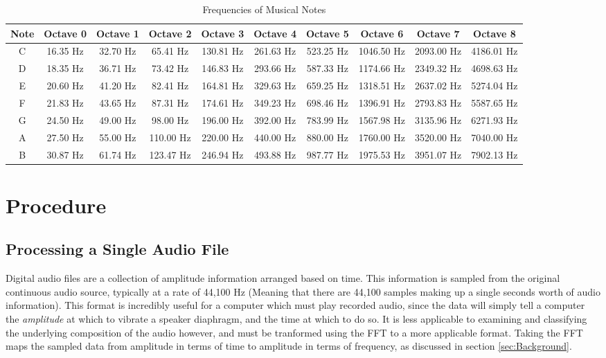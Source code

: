 \documentclass[conference]{IEEEtran}
\begin{document}
\begin{table*}[h]
  \centering
  \begin{tabular}{|c|*{9}{c|}}
    \hline
    Note & Octave 0 & Octave 1 & Octave 2 & Octave 3 & Octave 4 & Octave 5 & Octave 6 & Octave 7 & Octave 8 \\
    \hline
    C & 16.35 Hz & 32.70 Hz & 65.41 Hz & 130.81 Hz & 261.63 Hz & 523.25 Hz & 1046.50 Hz & 2093.00 Hz & 4186.01 Hz \\
    D & 18.35 Hz & 36.71 Hz & 73.42 Hz & 146.83 Hz & 293.66 Hz & 587.33 Hz & 1174.66 Hz & 2349.32 Hz & 4698.63 Hz \\
    E & 20.60 Hz & 41.20 Hz & 82.41 Hz & 164.81 Hz & 329.63 Hz & 659.25 Hz & 1318.51 Hz & 2637.02 Hz & 5274.04 Hz \\
    F & 21.83 Hz & 43.65 Hz & 87.31 Hz & 174.61 Hz & 349.23 Hz & 698.46 Hz & 1396.91 Hz & 2793.83 Hz & 5587.65 Hz \\
    G & 24.50 Hz & 49.00 Hz & 98.00 Hz & 196.00 Hz & 392.00 Hz & 783.99 Hz & 1567.98 Hz & 3135.96 Hz & 6271.93 Hz \\
    A & 27.50 Hz & 55.00 Hz & 110.00 Hz & 220.00 Hz & 440.00 Hz & 880.00 Hz & 1760.00 Hz & 3520.00 Hz & 7040.00 Hz \\
    B & 30.87 Hz & 61.74 Hz & 123.47 Hz & 246.94 Hz & 493.88 Hz & 987.77 Hz & 1975.53 Hz & 3951.07 Hz & 7902.13 Hz \\
    \hline
  \end{tabular}
  \caption{Frequencies of Musical Notes}
  \label{tab:music_notes}
\end{table*}

\section{Procedure}\label{sec:Procedure}

\subsection{Processing a Single Audio File}\label{sec:processing}
Digital audio files are a collection of amplitude information arranged based on time. This information is sampled from the original continuous audio source, typically at a rate of 44,100 Hz (Meaning that there are 44,100 samples making up a single seconds worth of audio information). This format is incredibly useful for a computer which must play recorded audio, since the data will simply tell a computer the \textit{amplitude} at which to vibrate a speaker diaphragm, and the time at which to do so. It is less applicable to examining and classifying the underlying composition of the audio however, and must be tranformed using the FFT to a more applicable format. Taking the FFT maps the sampled data from amplitude in terms of time to amplitude in terms of frequency, as discussed in section \eqref{sec:Background}.
\end{document}
